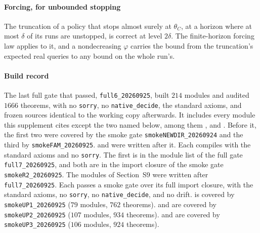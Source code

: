 \paragraph{Forcing, for unbounded stopping} The truncation of a policy that stops almost surely
at $\theta_C$, at a horizon where at most $\delta$ of its runs are unstopped, is correct at level
$2\delta$. The finite-horizon forcing law applies to it, and a nondecreasing $\varphi$ carries the
bound from the truncation's expected real queries to any bound on the whole run's.

\paragraph{Build record} The last full gate that passed, \texttt{full6\_20260925}, built $214$
modules and audited $1666$ theorems, with no \texttt{sorry}, no \texttt{native\_decide}, the
standard axioms, and frozen sources identical to the working copy afterwards. It includes every
module this supplement cites except the two named below, among
them ,  and
. Before it, the first two were covered by the smoke gate
\texttt{smokeNEWDIR\_20260924} and the third by \texttt{smokeFAM\_20260925}.
 and  were written after it.
Each compiles with the standard axioms and no \texttt{sorry}. The first is in the module list of the
full gate \texttt{full7\_20260925}, and both are in the import closure of the smoke gate
\texttt{smokeR2\_20260925}.
The modules of Section~S9 were written after \texttt{full7\_20260925}. Each passes a smoke gate
over its full import closure, with the standard axioms, no \texttt{sorry}, no
\texttt{native\_decide}, and no drift.  is covered by
\texttt{smokeUP1\_20260925} ($79$ modules, $762$ theorems).  and
 are covered by \texttt{smokeUP2\_20260925} ($107$ modules, $934$
theorems).  and  are covered by
\texttt{smokeUP3\_20260925} ($106$ modules, $924$ theorems).


